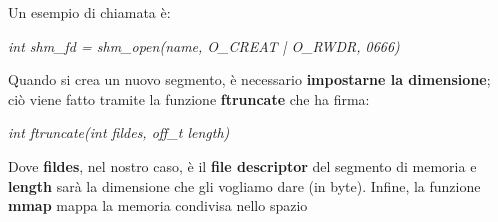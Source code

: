 \documentclass[12pt]{article}
\begin{document}
Un esempio di chiamata è:
\begin{center}
    \textit{int shm\_fd = shm\_open(name, O\_CREAT | O\_RWDR, 0666)}
\end{center}
Quando si crea un nuovo segmento, è necessario \textbf{impostarne la dimensione}; ciò viene fatto tramite la funzione
\textbf{ftruncate} che ha firma:
\begin{center}
    \textit{int ftruncate(int fildes, off\_t length)}
\end{center}
Dove \textbf{fildes}, nel nostro caso, è il \textbf{file descriptor} del segmento di memoria e \textbf{length} sarà la dimensione
che gli vogliamo dare (in byte).
Infine, la funzione \textbf{mmap} mappa la memoria condivisa nello spazio 
\end{document}
